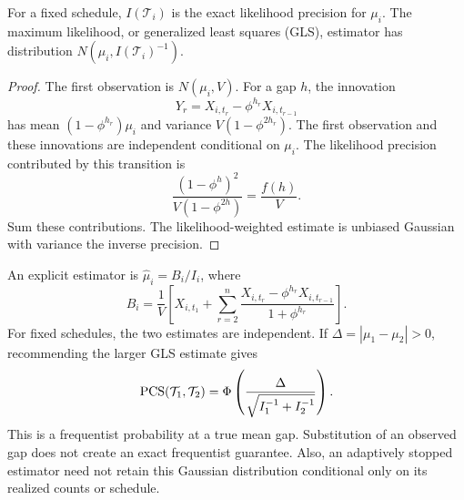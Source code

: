 \begin{proposition}
For a fixed schedule, $I(\mathcal T_i)$ is the exact likelihood precision for $\mu_i$. The maximum likelihood, or generalized least squares (GLS), estimator has distribution $N(\mu_i,I(\mathcal T_i)^{-1})$.
\end{proposition}
\begin{proof}
The first observation is $N(\mu_i,V)$. For a gap $h$, the innovation
\[
Y_r=X_{i,t_r}-\phi^{h_r}X_{i,t_{r-1}}
\]
has mean $(1-\phi^{h_r})\mu_i$ and variance $V(1-\phi^{2h_r})$. The first observation and these innovations are independent conditional on $\mu_i$. The likelihood precision contributed by this transition is
\[
\frac{(1-\phi^h)^2}{V(1-\phi^{2h})}=\frac{f(h)}V.
\]
Sum these contributions. The likelihood-weighted estimate is unbiased Gaussian with variance the inverse precision.
\end{proof}

An explicit estimator is $\widehat\mu_i=B_i/I_i$, where
\begin{equation}
B_i=\frac1V\left[X_{i,t_1}+\sum_{r=2}^n
\frac{X_{i,t_r}-\phi^{h_r}X_{i,t_{r-1}}}{1+\phi^{h_r}}\right].
\label{two_arm_ar1:eq:weighted}
\end{equation}
For fixed schedules, the two estimates are independent. If $\Delta=|\mu_1-\mu_2|>0$, recommending the larger GLS estimate gives
\begin{equation}
\operatorname{PCS}(\mathcal T_1,\mathcal T_2)
=\Phi\left(\frac{\Delta}{\sqrt{I_1^{-1}+I_2^{-1}}}\right).
\label{two_arm_ar1:eq:frequentist}
\end{equation}
This is a frequentist probability at a true mean gap. Substitution of an observed gap does not create an exact frequentist guarantee. Also, an adaptively stopped estimator need not retain this Gaussian distribution conditional only on its realized counts or schedule.

